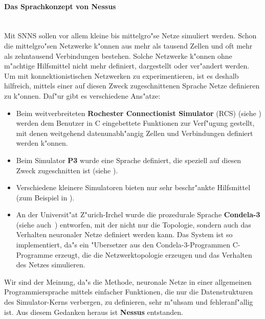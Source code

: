 \paragraph{Das Sprachkonzept von {\bf Nessus}}
~~\\
Mit SNNS sollen vor allem kleine bis mittelgro"se Netze
simuliert werden.  Schon die mittelgro"sen Netzwerke k"onnen aus mehr
als tausend Zellen und oft mehr als zehntausend Verbindungen bestehen.
Solche Netzwerke k"onnen ohne m"achtige Hilfsmittel nicht mehr
definiert, dargestellt oder ver"andert werden. Um mit
konnektionistischen Netzwerken zu
experimentieren, ist es deshalb hilfreich, mittels einer auf diesen
Zweck zugeschnittenen Sprache Netze definieren zu k"onnen. Daf"ur gibt
es verschiedene Ans"atze:

\begin{itemize}
  
\item  Beim weitverbreiteten {\bf Rochester Connectionist Simulator}
(RCS) (siehe
\cite{fel01,fel02,god87}) werden dem Benutzer in C eingebettete
Funktionen zur Verf"ugung gestellt, mit denen weitgehend
daten\-unab\-h"angig Zellen und Verbindungen definiert werden k"onnen.

\item Beim Simulator {\bf P3} wurde eine Sprache
definiert, die speziell auf diesen Zweck zugeschnitten ist (siehe
\cite{zip86}).

\item Verschiedene kleinere Simulatoren bieten nur sehr beschr"ankte
Hilfsmittel (zum Beispiel in \cite{rum863}).

\item An der Universit"at Z"urich-Irchel wurde die prozedurale
Sprache {\bf Condela-3} (siehe 	auch~\cite{alm90,koe88}) entworfen,
mit der nicht nur die Topologie, sondern auch das 	Verhalten
neuronaler Netze definiert werden kann. Das System ist so
implementiert, da"s ein 	"Ubersetzer aus den
Condela-3-Programmen C-Programme erzeugt, die die Netzwerktopologie
erzeugen und das Verhalten des Netzes simulieren.
\end{itemize}

Wir sind der Meinung, da"s die Methode, neuronale Netze in einer
allgemeinen Programmiersprache mittels einfacher Funktionen, die nur
die Datenstrukturen des Simulator-Kerns verbergen, zu definieren, sehr
m"uhsam und fehleranf"allig ist.  Aus diesem Gedanken heraus ist {\bf
Nessus} entstanden.

